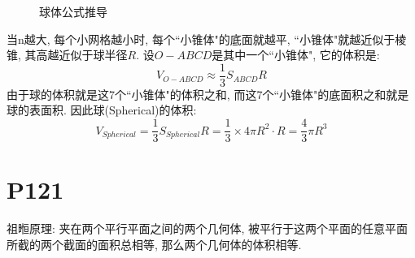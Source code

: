 \documentclass{book}
\begin{document}
        \begin{figure}[htbp]
          \centering            %
          \caption{球体公式推导}    %
          \label{fig:subfig_1}            %
        \end{figure}

        当n越大, 每个小网格越小时, 每个``小锥体"的底面就越平, ``小锥体"就越近似于棱锥, 其高越近似于球半径$R$. 设$O-ABCD$是其中一个``小锥体", 它的体积是:
        $$
        V_{O-ABCD}\approx \frac{1}{3}S_{ABCD}R
        $$
        由于球的体积就是这7个``小锥体"的体积之和, 而这7个``小锥体"的底面积之和就是球的表面积. 因此球(Spherical)的体积:
        $$
        V_{Spherical} = \frac{1}{3}S_{Spherical}R=\frac{1}{3}\times 4\pi R^2\cdot R=\frac{4}{3}\pi R^3
        $$
        \section{\textcolor[rgb]{0.11,0.65,0.52}{P121}}
        \textcolor[rgb]{0.38,0.11,0.2}{祖暅原理}: 夹在两个平行平面之间的两个几何体, 被平行于这两个平面的任意平面所截的两个截面的面积总相等, 那么两个几何体的体积相等.
\end{document}
